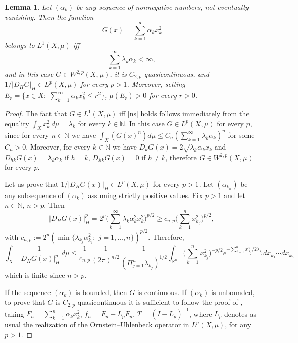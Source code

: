 \documentclass[reqno,twoside,12pt]{amsart}
\newtheorem{Lemma}[Theorem]{Lemma}
\begin{document}
\begin{Lemma}
\label{serie}
Let $(\alpha_k)$ be any  sequence of nonnegative numbers, not eventually vanishing. Then the function
$$G(x) = \sum_{k=1}^{\infty} \alpha_k x_k^2$$
belongs to $L^1(X, \mu)$ iff 
\begin{equation}
\label{ns}
\sum_{k=1}^{\infty} \lambda_k\alpha_k <\infty , 
\end{equation}
and in this case $G \in W^{2,p}(X, \mu)$, it is $C_{2,p}$-quasicontinuous, and $1/|D_HG|_H\in L^p(X, \mu)$ for every $p>1$. Moreover, setting $E_r=\{ x\in X:\; \sum_{k=1}^{\infty}\alpha_k x_k^2 \leq r^2\}$,  $\mu(E_r)>0$ for every $r>0$. 
\end{Lemma}
\begin{proof}
The fact that $G\in L^1(X, \mu)$ iff \eqref{ns} holds follows immediately from the equality $\int_X x_k^2\,d\mu = \lambda_k$ for every $k\in {\mathbb N}$. In this case $G\in L^p (X, \mu)$ for every $p$, since for every $n\in {\mathbb N}$
we have $\int_X (G(x)^n)d\mu \leq C_n (\sum_{k=1}^{\infty}\lambda_k\alpha_k)^n$ for some $C_n>0$. Moreover, for every $k\in {\mathbb N}$ we have $D_kG(x)= 2\sqrt{\lambda_k} \alpha_kx_k$ and $D_{hk}G(x)= \lambda_k\alpha_k $ if $h=k$, $D_{hk}G(x)= 0$ if $h\neq k$, therefore 
$G \in W^{2,p}(X, \mu)$ for every $p$. 

\vspace{1mm}
Let us prove that $1/|D_HG(x)|_H \in L^p(X, \mu)$ for every $p>1$. 
Let $(\alpha_{k_n})$ be any subsequence  of  $(\alpha_k)$ assuming strictly positive values. 
Fix $p>1$ and let $n\in {\mathbb N}$, $n>p$. Then
$$|D_HG(x)|_H^p = 2^p\bigg(\sum_{k=1}^{\infty}\lambda_k\alpha_k^2 x_k^2\bigg)^{p/2}\geq c_{n,p}
\bigg(\sum_{k=1}^{n} x_{k_j}^2\bigg)^{p/2}, $$
with $c_{n,p}:= 2^p(\min\{ \lambda_{k_j}\alpha_{k_j}^2:\; j=1, \ldots , n\})^{p/2}$. Therefore, 
$$\int_X \frac{1}{|D_HG(x)|_H^p}\,d\mu \leq  \frac{1}{c_{n,p}}\frac{1}{(2\pi)^{n/2}}  \frac{1}{(\Pi_{j=1}^{n} \lambda_{k_j})^{1/2}}\int_{{\mathbb R}^n} \bigg(\sum_{k=1}^{n} x_{k_j}^2\bigg)^{-p/2}e^{-\sum_{j=1}^nx_{k_j}^2/2\lambda_{k_j}}dx_{k_1}\cdots dx_{k_n}$$
which is finite since $n>p$. 
 

\vspace{1mm}
If the sequence $(\alpha_k)$ is bounded, then $G$ is continuous. If $(\alpha_k)$ is unbounded, to prove that $G$ is $C_{2,p}$-quasicontinuous it is sufficient to follow the proof of \cite[Thm. 5.9.6]{Boga}, taking 
$F_n = \sum_{k=1}^n \alpha_k x_k^2$, $f_n = F_n- L_pF_n$, $T= (I-L_p)^{-1}$, where $L_p$ denotes as usual the realization of the Ornstein--Uhlenbeck operator in $L^p(X, \mu)$, for any $p>1$. 


\end{proof}
\end{document}
